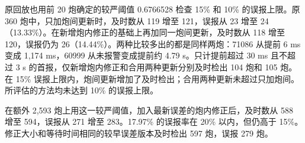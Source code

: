 原回放也用前 20 炮确定的较严阈值 0.6766528 检查 15\% 和 10\% 的误报上限。原 360 炮中，只加炮间更新时，及时数从 119 增至 121，误报从 23 增至 24（13.33\%）。在新增炮内修正的基础上再加同一炮间更新，及时数从 118 增至 120，误报仍为 26（14.44\%）。两种比较多出的都是同样两炮：71086 从提前 6 ms 变成 1,174 ms，60999 从未报警变成提前约 4.79 s。只计提前超过 30 ms 且不超过 3 s 的首报，仅新增炮内修正和合用两种更新分别及时检出 104 炮和 105 炮。在 15\% 误报上限内，炮间更新增加了及时检出；合用两种更新未超过只加炮间。所评估的方法均未达到 10\% 的误报上限。

在额外 2,593 炮上用这一较严阈值，加入最新误差的炮内修正后，及时数从 588 增至 594，误报从 271 增至 283。17.97\% 的误报率在 20\% 以内，但仍高于 15\%。修正大小和等待时间相同的较早误差版本及时检出 597 炮，误报 279 炮。
